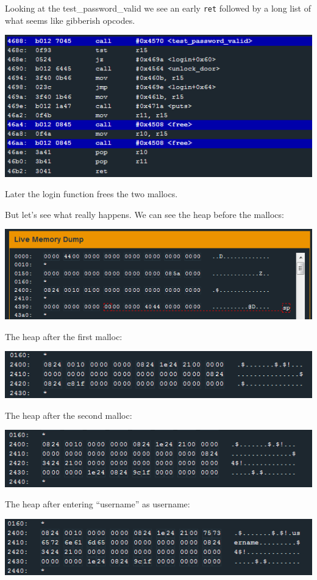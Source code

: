 Looking at the test\_password\_valid we see an early \texttt{ret}
followed by a long list of what seems like gibberish opcodes.

\includegraphics{img/14_4.PNG}

Later the login function frees the two mallocs.

But let's see what really happens. We can see the heap before the
mallocs:

\includegraphics{img/14_5.PNG}

The heap after the first malloc:

\includegraphics{img/14_6.PNG}

The heap after the second malloc:

\includegraphics{img/14_7.PNG}

The heap after entering ``username'' as username:

\includegraphics{img/14_8.PNG}

